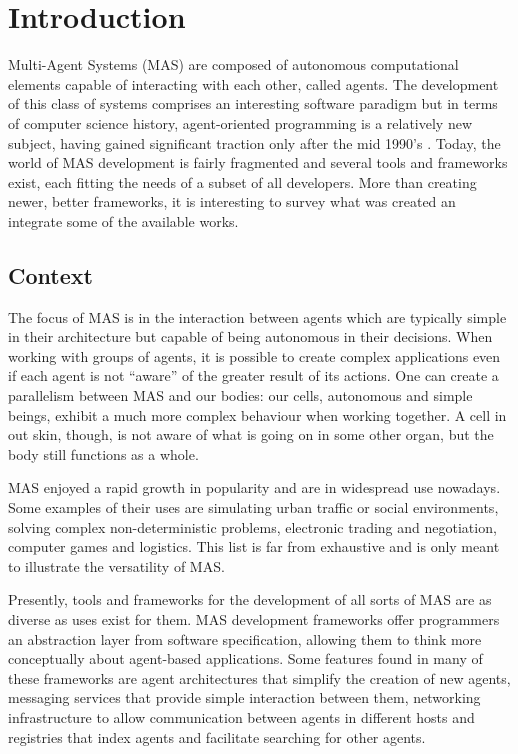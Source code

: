 \chapter{Introduction}
\label{chap:introduction}
Multi-Agent Systems (MAS) are composed of autonomous computational elements capable of interacting with each other, called agents. The development of this class of systems comprises an interesting software paradigm but in terms of computer science history, agent-oriented programming is a relatively new subject, having gained significant traction only after the mid 1990's \cite{wooldridge2008introduction}. Today, the world of MAS development is fairly fragmented and several tools and frameworks exist, each fitting the needs of a subset of all developers. More than creating newer, better frameworks, it is interesting to survey what was created an integrate some of the available works.

\section{Context}

The focus of MAS is in the interaction between agents which are typically simple in their architecture but capable of being autonomous in their decisions. When working with groups of agents, it is possible to create complex applications even if each agent is not ``aware'' of the greater result of its actions. One can create a parallelism between MAS and our bodies: our cells, autonomous and simple beings, exhibit a much more complex behaviour when working together. A cell in out skin, though, is not aware of what is going on in some other organ, but the body still functions as a whole\cite{ferber1999multi}.

MAS enjoyed a rapid growth in popularity and are in widespread use nowadays. Some examples of their uses are simulating urban traffic or social environments, solving complex non-deterministic problems, electronic trading and negotiation, computer games and logistics. This list is far from exhaustive and is only meant to illustrate the versatility of MAS.

Presently, tools and frameworks for the development of all sorts of MAS are as diverse as uses exist for them. MAS development frameworks offer programmers an abstraction layer from software specification, allowing them to think more conceptually about agent-based applications. Some features found in many of these frameworks are agent architectures that simplify the creation of new agents, messaging services that provide simple interaction between them, networking infrastructure to allow communication between agents in different hosts and registries that index agents and facilitate searching for other agents\cite{survey2}.

